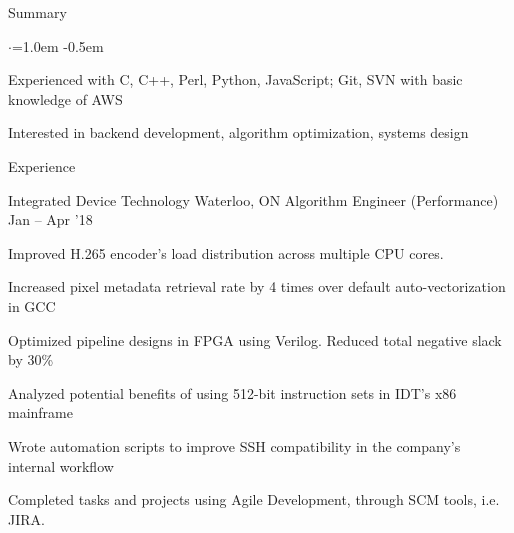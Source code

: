 \documentclass{resume} %
\begin{document}

\begin{rSection}{Summary}
  \vspace{0.5em}
  \begin{list}{$\cdot$}{\leftmargin=1.0em}
    \itemsep -0.5em \vspace{-0.5em}
    \item Experienced with C, C++, Perl, Python, JavaScript; Git, SVN with basic knowledge of AWS
	\item Interested in backend development, algorithm optimization, systems design
  \end{list}
  \vspace{0.5em}
\end{rSection}


\begin{rSection}{Experience}
  \begin{rWorkSection}{Integrated Device Technology}
                     {Waterloo, ON}
                     {Algorithm Engineer (Performance)}
                     {Jan -- Apr '18}
    \item Improved H.265 encoder's load distribution across multiple CPU cores.
    \item Increased pixel metadata retrieval rate by 4 times over default 
	  auto-vectorization in GCC
    \item Optimized pipeline designs in FPGA using Verilog. Reduced total
	  negative slack by 30\%
	  \item Analyzed potential benefits of using 512-bit instruction sets in 
	  IDT's x86 mainframe
    \item Wrote automation scripts to improve SSH compatibility in the
	  company's internal workflow
	  \item Completed tasks and projects using Agile Development, through SCM 
    tools, i.e. JIRA.
  \end{rWorkSection}
\end{rSection}
\end{document}
